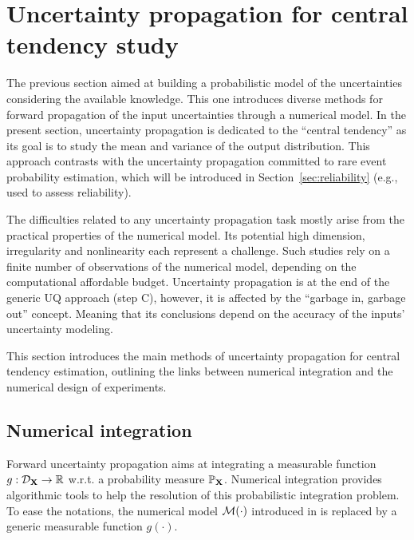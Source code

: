 \section{Uncertainty propagation for central tendency study} \label{sec:central_propagation}
The previous section aimed at building a probabilistic model of the uncertainties considering the available knowledge. 
This one introduces diverse methods for forward propagation of the input uncertainties through a numerical model. 
In the present section, uncertainty propagation is dedicated to the ``central tendency'' as its goal is to study the mean and variance of the output distribution. 
This approach contrasts with the uncertainty propagation committed to rare event probability estimation, which will be introduced in Section~\ref{sec:reliability} (e.g., used to assess reliability). 

The difficulties related to any uncertainty propagation task mostly arise from the practical properties of the numerical model. 
Its potential high dimension, irregularity and nonlinearity each represent a challenge. 
Such studies rely on a finite number of observations of the numerical model, depending on the computational affordable budget.  
Uncertainty propagation is at the end of the generic UQ approach (step C), however, it is affected by the ``garbage in, garbage out'' concept. 
Meaning that its conclusions depend on the accuracy of the inputs' uncertainty modeling. 

This section introduces the main methods of uncertainty propagation for central tendency estimation, 
outlining the links between numerical integration and the numerical design of experiments. 


\subsection{Numerical integration}
Forward uncertainty propagation aims at integrating a measurable function $g: \mathcal{D}_{{\bf X}} \rightarrow \mathbb{R}$ w.r.t. a probability measure $\mathbb{P}_{{\bf X}}$. 
Numerical integration provides algorithmic tools to help the resolution of this probabilistic integration problem. 
To ease the notations, the numerical model $\mathcal{M}(\cdot)$ introduced in  is replaced by a generic measurable function $g(\cdot)$.

